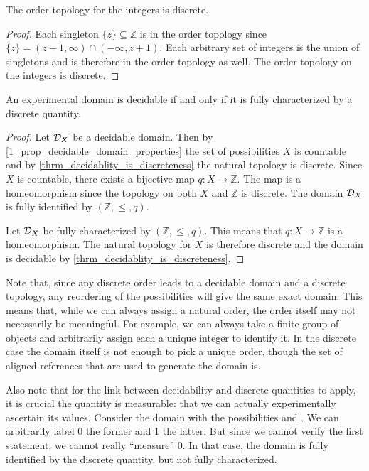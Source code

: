 \documentclass[11pt,letterpaper,fleqn]{memoir} %
\begin{document}
\begin{mathSection}
	\begin{prop}
		The order topology for the integers is discrete.
	\end{prop}
	\begin{proof}
		Each singleton $\{z\} \subseteq \mathbb{Z}$ is in the order topology since $\{z\} = (z-1, \infty) \cap (-\infty, z+1)$. Each arbitrary set of integers is the union of singletons and is therefore in the order topology as well. The order topology on the integers is discrete.
	\end{proof}
	
	\begin{prop}
		An experimental domain is decidable if and only if it is fully characterized by a discrete quantity.
	\end{prop}
	
	\begin{proof}
		Let $\mathcal{D}_X$ be a decidable domain. Then by \ref{1_prop_decidable_domain_properties} the set of possibilities $X$ is countable and by \ref{thrm_decidablity_is_discreteness} the natural topology is discrete. Since $X$ is countable, there exists a bijective map $q: X \to \mathbb{Z}$. The map is a homeomorphism since the topology on both $X$ and $\mathbb{Z}$ is discrete. The domain $\mathcal{D}_X$ is fully identified by $(\mathbb{Z}, \leq, q)$.
		
		Let $\mathcal{D}_X$ be fully characterized by $(\mathbb{Z}, \leq, q)$. This means that $q : X \to \mathbb{Z}$ is a homeomorphism. The natural topology for $X$ is therefore discrete and the domain is decidable by \ref{thrm_decidablity_is_discreteness}.
	\end{proof}	
	
\end{mathSection}

Note that, since any discrete order leads to a decidable domain and a discrete topology, any reordering of the possibilities will give the same exact domain. This means that, while we can always assign a natural order, the order itself may not necessarily be meaningful. For example, we can always take a finite group of objects and arbitrarily assign each a unique integer to identify it. In the discrete case the domain itself is not enough to pick a unique order, though the set of aligned references that are used to generate the domain is.

Also note that for the link between decidability and discrete quantities to apply, it is crucial the quantity is measurable: that we can actually experimentally ascertain its values. Consider the domain with the possibilities  and . We can arbitrarily label 0 the former and 1 the latter. But since we cannot verify the first statement, we cannot really ``measure'' 0. In that case, the domain is fully identified by the discrete quantity, but not fully characterized.
\end{document}
